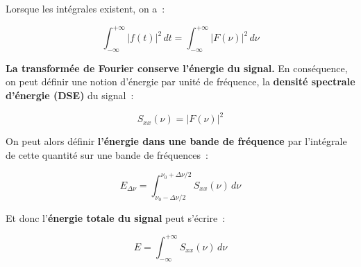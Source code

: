 Lorsque les intégrales existent, on a~:

\begin{equation}
	\int^{+\infty}_{-\infty}\left|f(t)\right|^2\,dt = \int^{+\infty}_{-\infty} \left| F(\nu) \right| ^2 \, d\nu
\end{equation} 

\textbf{La transformée de Fourier conserve l'énergie du signal.} En conséquence, on peut définir une notion d'énergie par unité de fréquence, la \textbf{densité spectrale d'énergie (DSE)} du signal~:

\begin{equation}
	S_{xx}(\nu) = \left| F(\nu) \right|^2
\end{equation}

On peut alors définir \textbf{l'énergie dans une bande de fréquence} par l'intégrale de cette quantité sur une bande de fréquences~: \\
\begin{center}
\begin{minipage}{0.4\textwidth}
\begin{center}

\end{center}
\end{minipage}
\begin{minipage}{0.5\textwidth}
\begin{equation}
E_{\Delta\nu} = \int^{\nu_0+\Delta\nu/2}_{\nu_0-\Delta\nu/2} S_{xx}(\nu)\,d\nu
\end{equation}
\end{minipage}
\end{center}

Et donc l'\textbf{énergie totale du signal} peut s'écrire~:

\begin{equation}
E = \int^{+\infty}_{-\infty} S_{xx}(\nu)\,d\nu
\end{equation}

\pagebreak

